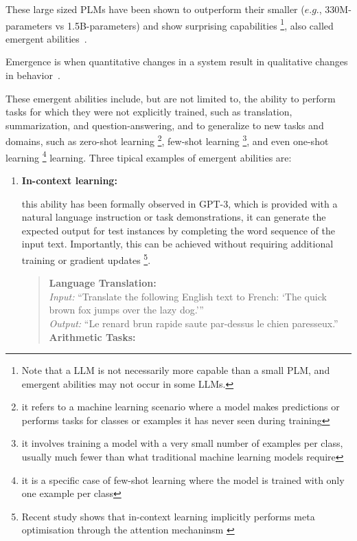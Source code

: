 \begin{enumerate}
{\begin{itemize}
        \end{itemize}
        These large sized PLMs have been shown to outperform their smaller ($e.g.$, 330M-parameters vs 1.5B-parameters) and show surprising capabilities \footnote{Note that a LLM is not necessarily more capable than a small PLM, and emergent abilities may not occur in some LLMs.}, also called emergent abilities~\cite{emergent2}.
        \begin{displayquote}
            Emergence is when quantitative changes in a system result in qualitative changes in behavior~\cite{emergent1}.
        \end{displayquote}
        These emergent abilities include, but are not limited to, the ability to perform tasks for which they were not explicitly trained, such as translation, summarization, and question-answering, and to generalize to new tasks and domains, such as zero-shot learning \footnote{it refers to a machine learning scenario where a model makes predictions or performs tasks for classes or examples it has never seen during training}, few-shot learning \footnote{it involves training a model with a very small number of examples per class, usually much fewer than what traditional machine learning models require}, and even one-shot learning \footnote{it is a specific case of few-shot learning where the model is trained with only one example per class} learning.
        Three tipical examples of emergent abilities are:
        \begin{enumerate}
            \item \textbf{In-context learning:} {this ability has been formally observed in GPT-3, which is provided with a natural language instruction or task demonstrations, it can generate the expected output for test instances by completing the word sequence of the input text. Importantly, this can be achieved without requiring additional training or gradient updates \footnote{Recent study shows that in-context learning implicitly performs meta optimisation through the attention mechaninsm \cite{icl}}.
                \begin{quote}
                    \textbf{Language Translation:} \\
                    \textit{Input:} {\enquote{Translate the following English text to French: `The quick brown fox jumps over the lazy dog.'}} \\
                    \textit{Output:} {\enquote{Le renard brun rapide saute par-dessus le chien paresseux.}}\\
                    \textbf{Arithmetic Tasks:} \\

\end{quote}}
\end{enumerate}}
\end{enumerate}
